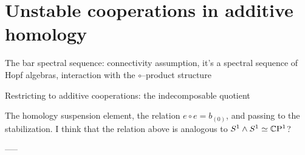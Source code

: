 \section{Unstable cooperations in additive homology}\label{UnstableSteenrodCoops}

The bar spectral sequence: connectivity assumption, it's a spectral sequence of Hopf algebras, interaction with the $\circ$--product structure

Restricting to additive cooperations: the indecomposable quotient

The homology suspension element, the relation $e \circ e = b_{(0)}$, and passing to the stabilization.  I think that the relation above is analogous to $S^1 \wedge S^1 \simeq \mathbb{C}\mathrm P^1$?



-----

